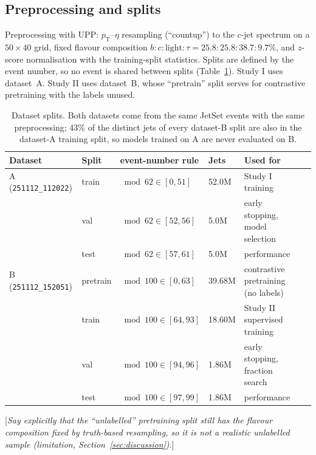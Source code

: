 \documentclass[11pt,a4paper]{article}
\newcommand{\note}[1]{\textcolor{blue!70!black}{[\emph{#1}]}}
\newcommand{\pT}{\ensuremath{p_{\mathrm{T}}}}
\begin{document}
\subsection{Preprocessing and splits}
Preprocessing with UPP: \pT--$\eta$ resampling (``countup'') to the $c$-jet spectrum on a
$50\times40$ grid, fixed flavour composition $b:c:\text{light}:\tau = 25.8:25.8:38.7:9.7\%$,
and $z$-score normalisation with the training-split statistics. Splits are defined by the
event number, so no event is shared between splits (Table~\ref{tab:splits}). Study I uses
dataset~A. Study II uses dataset~B, whose ``pretrain'' split serves for contrastive
pretraining with the labels unused.

\begin{table}[htbp]
\centering\small
\caption{Dataset splits. Both datasets come from the same JetSet events with the same
preprocessing; 43\% of the distinct jets of every dataset-B split are also in the dataset-A
training split, so models trained on A are never evaluated on B.}
\label{tab:splits}
\begin{tabular}{llllll}
\toprule
Dataset & Split & event-number rule & Jets & Used for \\
\midrule
A (\texttt{251112\_112022}) & train & $\bmod 62 \in [0,51]$  & 52.0M  & Study I training \\
                            & val   & $\bmod 62 \in [52,56]$ & 5.0M   & early stopping, model selection \\
                            & test  & $\bmod 62 \in [57,61]$ & 5.0M   & performance \\
\midrule
B (\texttt{251112\_152051}) & pretrain & $\bmod 100 \in [0,63]$  & 39.68M & contrastive pretraining (no labels) \\
                            & train    & $\bmod 100 \in [64,93]$ & 18.60M & Study II supervised training \\
                            & val      & $\bmod 100 \in [94,96]$ & 1.86M  & early stopping, fraction search \\
                            & test     & $\bmod 100 \in [97,99]$ & 1.86M  & performance \\
\bottomrule
\end{tabular}
\end{table}

\note{Say explicitly that the ``unlabelled'' pretraining split still has the flavour
composition fixed by truth-based resampling, so it is not a realistic unlabelled sample
(limitation, Section~\ref{sec:discussion}).}
\end{document}
